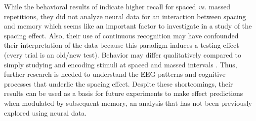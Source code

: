While the behavioral results of  indicate higher recall for spaced \textit{vs.} massed repetitions, they did not analyze neural data for an interaction between spacing and memory which seems like an important factor to investigate in a study of the spacing effect.  Also, their use of continuous recognition may have confounded their interpretation of the data because this paradigm induces a testing effect (every trial is an old/new test).  Behavior may differ qualitatively compared to simply studying and encoding stimuli at spaced and massed intervals \cite[p.~91]{DelaEtal2010}.
Thus, further research is needed to understand the EEG patterns and cognitive processes that underlie the spacing effect.  Despite these shortcomings, their results can be used as a basis for future experiments to make effect predictions when modulated by subsequent memory, an analysis that has not been previously explored using neural data.







